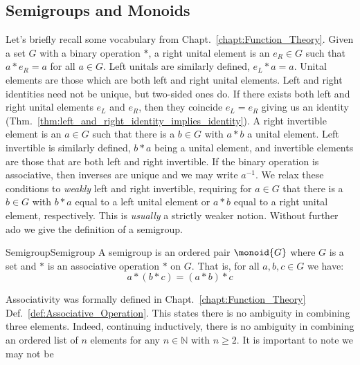     \subsection{Semigroups and Monoids}
        Let's briefly recall some vocabulary from
        Chapt.~\ref{chapt:Function_Theory}. Given a set $G$ with a binary
        operation $*$, a right unital element is an $e_{R}\in{G}$ such that
        $a*e_{R}=a$ for all $a\in{G}$. Left unitals are similarly defined,
        $e_{L}*a=a$. Unital elements are those which are both left and right
        unital elements. Left and right identities need not be unique, but
        two-sided ones do. If there exists both left and right unital elements
        $e_{L}$ and $e_{R}$, then they coincide $e_{L}=e_{R}$ giving us an
        identity (Thm.~\ref{thm:left_and_right_identity_implies_identity}). A
        right invertible element is an $a\in{G}$ such that there is a $b\in{G}$
        with $a*b$ a unital element. Left invertible is similarly defined, $b*a$
        being a unital element, and invertible elements are those that are both
        left and right invertible. If the binary operation is associative, then
        inverses are unique and we may write $a^{\minus{1}}$. We relax these
        conditions to \textit{weakly} left and right invertible, requiring for
        $a\in{G}$ that there is a $b\in{G}$ with $b*a$ equal to a left unital
        element or $a*b$ equal to a right unital element, respectively. This is
        \textit{usually} a strictly weaker notion. Without further ado we give
        the definition of a semigroup.
        \begin{fdefinition}{Semigroup}{Semigroup}
            A \gls{semigroup} is an \gls{ordered pair} $\monoid{G}$ where $G$ is
            a \gls{set} and $*$ is an \gls{associative operation} $*$ on $G$.
            That is, for all $a,b,c\in{G}$ we have:
            \begin{equation}
                \label{eqn:Semigroup_Associativity}
                a*(b*c)=(a*b)*c\tag{1}
            \end{equation}
        \end{fdefinition}
        Associativity was formally defined in Chapt.~\ref{chapt:Function_Theory}
        Def.~\ref{def:Associative_Operation}. This states there is no ambiguity
        in combining three elements. Indeed, continuing inductively, there is no
        ambiguity in combining an ordered list of $n$ elements for any
        $n\in\mathbb{N}$ with $n\geq{2}$. It is important to note we may not be
